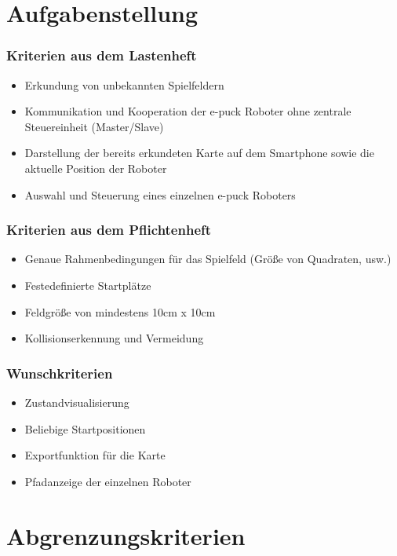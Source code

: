 \documentclass{beamer}
\begin{document}
\section{Aufgabenstellung}

\begin{frame}
  \frametitle{Kriterien aus dem Lastenheft}
  
	\begin{itemize}
		\item Erkundung von unbekannten Spielfeldern
		\item Kommunikation und Kooperation der e-puck Roboter ohne zentrale Steuereinheit 				(Master/Slave)
		\item Darstellung der bereits erkundeten Karte auf dem Smartphone sowie die 					aktuelle Position der Roboter
		\item Auswahl und Steuerung eines einzelnen e-puck Roboters
	\end{itemize}  
\end{frame}

\begin{frame}
  \frametitle{Kriterien aus dem Pflichtenheft}
  
  	\begin{itemize}
		\item Genaue Rahmenbedingungen für das Spielfeld (Größe von Quadraten, usw.)
		\item Festedefinierte Startplätze
		\item Feldgröße von mindestens 10cm x 10cm
		\item Kollisionserkennung und Vermeidung
	\end{itemize}  
\end{frame}

\begin{frame}
  \frametitle{Wunschkriterien}
  
  	\begin{itemize}
		\item Zustandvisualisierung
		\item Beliebige Startpositionen
		\item Exportfunktion für die Karte
		\item Pfadanzeige der einzelnen Roboter
	\end{itemize}  
\end{frame}


\section{Abgrenzungskriterien}
\end{document}
